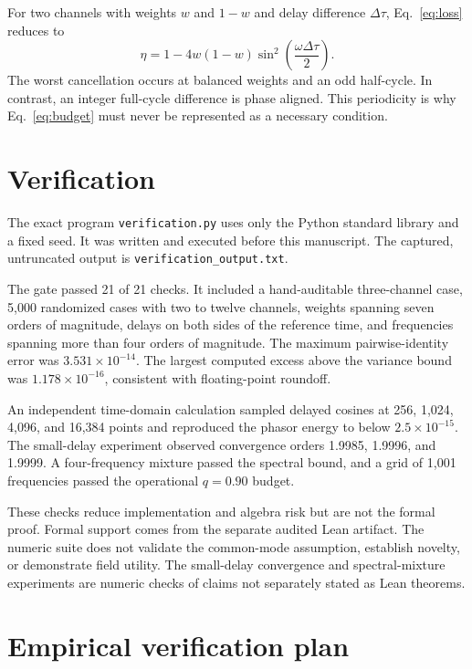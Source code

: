 \documentclass[10pt]{article}
\begin{document}
For two channels with weights $w$ and $1-w$ and delay difference $\Delta\tau$,
Eq.~\eqref{eq:loss} reduces to
\begin{equation}
\eta=1-4w(1-w)\sin^2\!\left(\frac{\omega\Delta\tau}{2}\right).
\end{equation}
The worst cancellation occurs at balanced weights and an odd half-cycle.  In
contrast, an integer full-cycle difference is phase aligned.  This periodicity
is why Eq.~\eqref{eq:budget} must never be represented as a necessary condition.

\section{Verification}

The exact program \texttt{verification.py} uses only the Python standard
library and a fixed seed.  It was written and executed before this manuscript.
The captured, untruncated output is \texttt{verification\_output.txt}.

The gate passed 21 of 21 checks.  It included a hand-auditable three-channel
case, 5,000 randomized cases with two to twelve channels, weights spanning seven
orders of magnitude, delays on both sides of the reference time, and frequencies
spanning more than four orders of magnitude.  The maximum pairwise-identity
error was $3.531\times10^{-14}$.  The largest computed excess above the variance
bound was $1.178\times10^{-16}$, consistent with floating-point roundoff.

An independent time-domain calculation sampled delayed cosines at 256, 1,024,
4,096, and 16,384 points and reproduced the phasor energy to below
$2.5\times10^{-15}$.  The small-delay experiment observed convergence orders
1.9985, 1.9996, and 1.9999.  A four-frequency mixture passed the spectral bound,
and a grid of 1,001 frequencies passed the operational $q=0.90$ budget.

\begingroup\raggedright
These checks reduce implementation and algebra risk but are not the formal
proof.  Formal support comes from the separate audited Lean artifact.  The
numeric suite does not validate the common-mode assumption, establish novelty,
or demonstrate field utility.  The small-delay convergence and spectral-mixture
experiments are numeric checks of claims not separately stated as Lean
theorems.\par
\endgroup

\section{Empirical verification plan}
\end{document}

